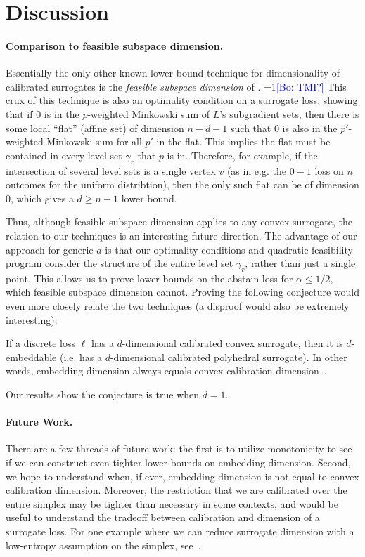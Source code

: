 \documentclass[anon]{colt2020} %
\newcommand{\Comments}{1}
\newcommand{\mynote}[2]{\ifnum\Comments=1\textcolor{#1}{#2}\fi}
\newcommand{\bo}[1]{\mynote{blue}{[Bo: #1]}}
\begin{document}
\section{Discussion} \label{sec:conclusion}
\paragraph{Comparison to feasible subspace dimension.}
Essentially the only other known lower-bound technique for dimensionality of calibrated surrogates is the \emph{feasible subspace dimension} of \cite{ramaswamy2016convex}.
\bo{TMI?}
This crux of this technique is also an optimality condition on a surrogate loss, showing that if $0$ is in the $p$-weighted Minkowski sum of $L$'s subgradient sets, then there is some local ``flat'' (affine set) of dimension $n-d-1$ such that $0$ is also in the $p'$-weighted Minkowski sum for all $p'$ in the flat.
This implies the flat must be contained in every level set $\gamma_r$ that $p$ is in.
Therefore, for example, if the intersection of several level sets is a single vertex $v$ (as in e.g. the $0-1$ loss on $n$ outcomes for the uniform distribtion), then the only such flat can be of dimension $0$, which gives a $d \geq n-1$ lower bound.

Thus, although feasible subspace dimension applies to any convex surrogate, the relation to our techniques is an interesting future direction.
The advantage of our approach for generic-$d$ is that our optimality conditions and quadratic feasibility program consider the structure of the entire level set $\gamma_r$, rather than just a single point.
This allows us to prove lower bounds on the abstain loss for $\alpha \leq 1/2$, which feasible subspace dimension cannot.
Proving the following conjecture would even more closely relate the two techniques (a disproof would also be extremely interesting):
\begin{conjecture}
  If a discrete loss $\ell$ has a $d$-dimensional calibrated convex surrogate, then it is $d$-embeddable (i.e. has a $d$-dimensional calibrated polyhedral surrogate).
  In other words, embedding dimension always equals convex calibration dimension~\citep{ramaswamy2016convex}.
\end{conjecture}
Our results show the conjecture is true when $d=1$.

\paragraph{Future Work.}
There are a few threads of future work: the first is to utilize monotonicity to see if we can construct even tighter lower bounds on embedding dimension.
Second, we hope to understand when, if ever, embedding dimension is not equal to convex calibration dimension.
Moreover, the restriction that we are calibrated over the entire simplex may be tighter than necessary in some contexts, and would be useful to understand the tradeoff between calibration and dimension of a surrogate loss.
For one example where we can reduce surrogate dimension with a low-entropy assumption on the simplex, see~\cite[Example 6]{agarwal2015consistent}.
\end{document}
